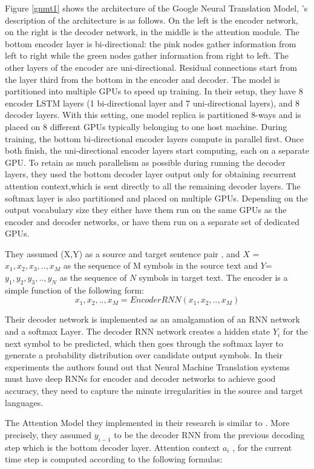 Figure \ref{gnmt1} shows the architecture of the Google Neural Translation Model, \cite{45610}'s description of the architecture is as follows. On the left is the encoder network, on the right is the decoder network, in the middle is the attention module. The bottom encoder layer is bi-directional: the pink nodes gather information from left to right while the green nodes gather information from right to left. The other layers of the encoder are uni-directional. Residual connections start from the layer third from the bottom in the encoder and decoder. The model is partitioned into multiple GPUs to speed up training. In their setup, they have 8 encoder LSTM layers (1 bi-directional layer and 7 uni-directional layers), and 8 decoder layers. With this setting, one model replica is partitioned 8-ways and is placed on 8 different GPUs typically belonging to one host machine. During training, the bottom bi-directional encoder layers compute in parallel first. Once both finish, the uni-directional encoder layers start computing, each on a separate GPU. To retain as much parallelism as possible during running the decoder layers, they used the bottom decoder layer output only for obtaining recurrent attention context,which is sent directly to all the remaining decoder layers. The softmax layer is also partitioned and placed on multiple GPUs. Depending on the output vocabulary size they either have them run on the same GPUs as the
encoder and decoder networks, or have them run on a separate set of dedicated GPUs.

They assumed (X,Y) as a source and target sentence pair , and $X$ = $x_1,x_2,x_3,..,x_M$ as the sequence of M symbols in the source text and $Y$= $y_1,y_2,y_3,.., y_N$ as the sequence of $N$ symbols in target text. The encoder is a simple function of the following form:
$$x_1,x_2,..,x_M = EncoderRNN(x_1,x_2,..,x_M)$$

Their decoder network is implemented as an amalgamation of an RNN network and a softmax Layer. The decoder RNN network creates a hidden state $Y_i$ for the next symbol to be predicted, which then goes through the softmax layer to generate a probability distribution over candidate output symbols. In their experiments the authors found out that Neural Machine Translation systems must have deep RNNs for encoder and decoder networks to achieve good accuracy, they need to capture the minute irregularities in the source and target languages. 

The Attention Model they implemented in their research is similar to \citep{DBLP:journals/corr/BahdanauCB14}. More precisely, they assumed $y_{i-1}$ to be the decoder RNN from the previous decoding step which is the bottom decoder layer. Attention context $a_i$ , for the current time step is computed according to the following formulas:

